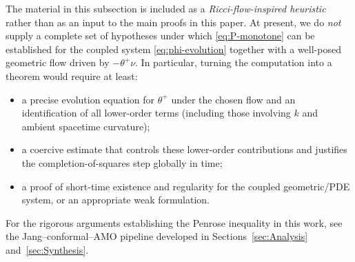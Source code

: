 \begin{remark}
\label{rem:P-functional-status}
The material in this subsection is included as a \emph{Ricci-flow-inspired heuristic} rather than as an input to the main proofs in this paper.
At present, we do \emph{not} supply a complete set of hypotheses under which \eqref{eq:P-monotone} can be established for the coupled system
\eqref{eq:phi-evolution} together with a well-posed geometric flow driven by $-\theta^+\nu$.
In particular, turning the computation into a theorem would require at least:
\begin{itemize}
\item a precise evolution equation for $\theta^+$ under the chosen flow and an identification of all lower-order terms (including those involving $k$ and ambient spacetime curvature);
\item a coercive estimate that controls these lower-order contributions and justifies the completion-of-squares step globally in time;
\item a proof of short-time existence and regularity for the coupled geometric/PDE system, or an appropriate weak formulation.
\end{itemize}
For the rigorous arguments establishing the Penrose inequality in this work, see the Jang--conformal--AMO pipeline developed in Sections~\ref{sec:Analysis} and~\ref{sec:Synthesis}.
\end{remark}

